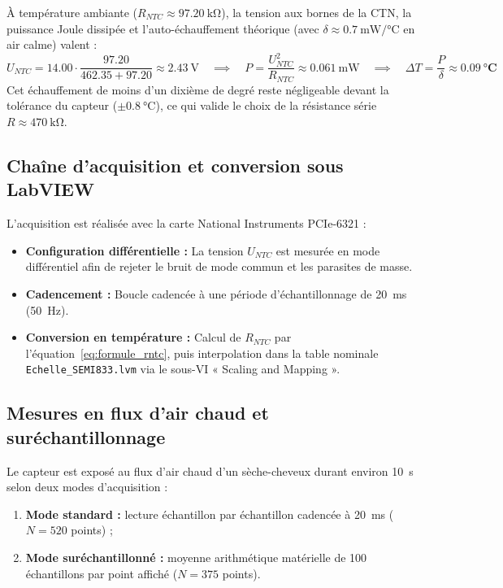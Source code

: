 À température ambiante ($R_{NTC} \approx \qty{97.20}{\kilo\ohm}$), la tension aux bornes de la CTN, la puissance Joule dissipée et l'auto-échauffement théorique (avec $\delta \approx \qty{0.7}{\milli\watt\per\degreeCelsius}$ en air calme) valent :
\begin{equation}
    U_{NTC} = 14.00 \cdot \frac{97.20}{462.35 + 97.20} \approx \qty{2.43}{\volt} \quad \implies \quad P = \frac{U_{NTC}^2}{R_{NTC}} \approx \qty{0.061}{\milli\watt} \quad \implies \quad \Delta T = \frac{P}{\delta} \approx \mathbf{\qty{0.09}{\degreeCelsius}}
\end{equation}
Cet échauffement de moins d'un dixième de degré reste négligeable devant la tolérance du capteur ($\pm \qty{0.8}{\degreeCelsius}$), ce qui valide le choix de la résistance série $R \approx \qty{470}{\kilo\ohm}$.

\subsection{Chaîne d'acquisition et conversion sous LabVIEW}
\label{subsec:ntc_labview}

L'acquisition est réalisée avec la carte National Instruments PCIe-6321 :
\begin{itemize}[leftmargin=1.2cm,topsep=2pt,itemsep=1pt]
    \item \textbf{Configuration différentielle :} La tension $U_{NTC}$ est mesurée en mode différentiel afin de rejeter le bruit de mode commun et les parasites de masse.
    \item \textbf{Cadencement :} Boucle cadencée à une période d'échantillonnage de \qty{20}{\milli\second} (\qty{50}{\hertz}).
    \item \textbf{Conversion en température :} Calcul de $R_{NTC}$ par l'équation~\eqref{eq:formule_rntc}, puis interpolation dans la table nominale \texttt{Echelle\_SEMI833.lvm} via le sous-VI « Scaling and Mapping ».
\end{itemize}

\subsection{Mesures en flux d'air chaud et suréchantillonnage}
\label{subsec:ntc_oversampling}

Le capteur est exposé au flux d'air chaud d'un sèche-cheveux durant environ \qty{10}{\second} selon deux modes d'acquisition :
\begin{enumerate}[leftmargin=1.2cm,topsep=2pt,itemsep=1pt]
    \item \textbf{Mode standard :} lecture échantillon par échantillon cadencée à \qty{20}{\milli\second} ($N = 520$ points) ;
    \item \textbf{Mode suréchantillonné :} moyenne arithmétique matérielle de 100 échantillons par point affiché ($N = 375$ points).
\end{enumerate}

